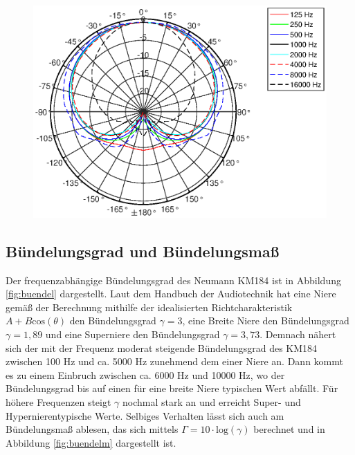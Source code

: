 \begin{figure}[bth]
    \centering
    \includegraphics[width=\linewidth]{Figures/KM184_allfreqs}
    \label{fig:Polar_allfreqs}
\end{figure}


\subsection{Bündelungsgrad und Bündelungsmaß}
\label{subsec:e}

Der frequenzabhängige Bündelungsgrad des Neumann KM184 ist in Abbildung \ref{fig:buendel} dargestellt. 
Laut dem Handbuch der Audiotechnik \cite{Weinzierl08} hat eine Niere gemäß der Berechnung mithilfe der idealisierten Richtcharakteristik $A + B \mathrm{cos}(\theta)$ den Bündelungsgrad $\gamma = 3$, eine Breite Niere den Bündelungsgrad $\gamma = 1,89$ und eine Superniere den Bündelungsgrad $\gamma = 3,73$.
Demnach nähert sich der mit der Frequenz moderat steigende Bündelungsgrad des KM184 zwischen 100 Hz und ca. 5000 Hz zunehmend dem einer Niere an.
Dann kommt es zu einem Einbruch zwischen ca. 6000 Hz und 10000 Hz, wo der Bündelungsgrad bis auf einen für eine breite Niere typischen Wert abfällt. 
Für höhere Frequenzen steigt $\gamma$ nochmal stark an und erreicht  Super- und Hypernierentypische Werte. 
Selbiges Verhalten lässt sich auch am Bündelungsmaß ablesen, das sich mittels $\Gamma = 10\cdot \mathrm{log}(\gamma)$ berechnet
 und in Abbildung \ref{fig:buendelm} dargestellt ist.

